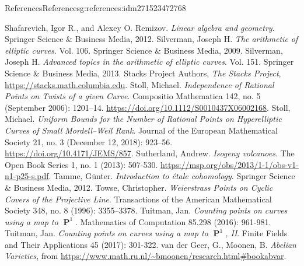 \documentclass[oneside,10pt,]{book}
\numberwithin{equation}{section}
\DeclareMathOperator{\PP}{\mathbf{P}}
\begin{document}
\begin{references-chapter-numberless}{References}{}{References}{}{}{g:references:idm271523472768}
\begin{thebibliography}{9}
\hypertarget{x:biblio:bib-shafarevich-remizov}{}Shafarevich, Igor R., and Alexey O. Remizov. \textit{Linear algebra and geometry}. Springer Science \& Business Media, 2012.
\hypertarget{x:biblio:bib-silverman}{}Silverman, Joseph H. \textit{The arithmetic of elliptic curves}. Vol. 106. Springer Science \& Business Media, 2009.
\hypertarget{x:biblio:bib-silverman-advanced}{}Silverman, Joseph H. \textit{Advanced topics in the arithmetic of elliptic curves}. Vol. 151. Springer Science \& Business Media, 2013.
\hypertarget{x:biblio:bib-stacks}{}Stacks Project Authors, \textit{The Stacks Project}, \url{https://stacks.math.columbia.edu}.
\hypertarget{x:biblio:bib-stoll-independence}{}Stoll, Michael. \textit{Independence of Rational Points on Twists of a given Curve}. Compositio Mathematica 142, no. 5 (September 2006): 1201–14. \url{https://doi.org/10.1112/S0010437X06002168}.
\hypertarget{x:biblio:bib-stoll-uniform}{}Stoll, Michael. \textit{Uniform Bounds for the Number of Rational Points on Hyperelliptic Curves of Small Mordell–Weil Rank}. Journal of the European Mathematical Society 21, no. 3 (December 12, 2018): 923–56. \url{https://doi.org/10.4171/JEMS/857}.
\hypertarget{x:biblio:bib-sutherland}{}Sutherland, Andrew. \textit{Isogeny volcanoes}. The Open Book Series 1, no. 1 (2013): 507-530. \url{https://msp.org/obs/2013/1-1/obs-v1-n1-p25-s.pdf}.
\hypertarget{x:biblio:bib-tamme}{}Tamme, Günter. \textit{Introduction to étale cohomology}. Springer Science \& Business Media, 2012.
\hypertarget{x:biblio:bib-towse}{}Towse, Christopher. \textit{Weierstrass Points on Cyclic Covers of the Projective Line}. Transactions of the American Mathematical Society 348, no. 8 (1996): 3355–3378.
\hypertarget{x:biblio:bib-tuitman-map-to-p1-1}{}Tuitman, Jan. \textit{Counting points on curves using a map to \(\PP^1\)}. Mathematics of Computation 85.298 (2016): 961-981.
\hypertarget{x:biblio:bib-tuitman-map-to-p1-2}{}Tuitman, Jan. \textit{Counting points on curves using a map to \(\PP^1\), II}. Finite Fields and Their Applications 45 (2017): 301-322.
\hypertarget{x:biblio:bib-vandergeer-moonen}{}van der Geer, G., Moonen, B. \textit{Abelian Varieties}, from \url{https://www.math.ru.nl/\~bmoonen/research.html\#bookabvar}.

\end{thebibliography}
\end{references-chapter-numberless}
\end{document}
